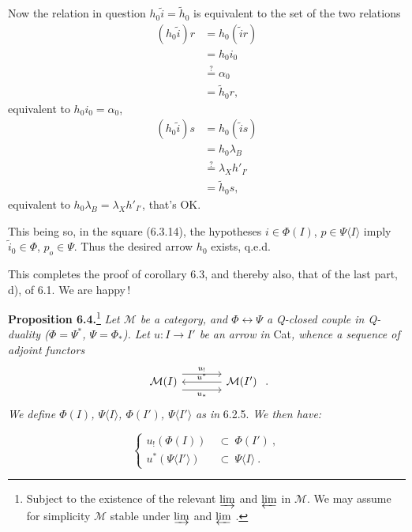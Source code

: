 
Now the relation in question $h_0\tilde{i} = \tilde{h}_0$ is equivalent to the set of the two relations
\[
\begin{aligned}
(h_0\tilde{i})r &= h_0(\tilde{i}r)\\
&= h_0i_0\\
&\overset{?}{=} \alpha_0\\
&= \tilde{h}_0r,
\end{aligned}
\]
equivalent to $h_0i_0 = \alpha_0$,
\[
\begin{aligned}
(h_0\tilde{i})s &= h_0(\tilde{i}s)\\
&= h_0\lambda_B\\
&\overset{?}{=} \lambda_Xh'_{I'}\\
&= \tilde{h}_0s,
\end{aligned}
\]
equivalent to $h_0\lambda_B = \lambda_Xh'_{I'}$, that's OK.

This being so, in the square (6.3.14), the hypotheses $i \in \Phi(I)$, $p \in \Psi\langle I\rangle$ imply $\tilde{i}_0 \in \Phi$, $p_o \in \Psi$. Thus the desired arrow $h_0$ exists, q.e.d. %

This completes the proof of corollary 6.3, and thereby also, that of the last part, d), of 6.1. We are happy\,!


\textbf{Proposition 6.4.}\footnote[34]{Subject to the existence of the relevant $\varinjlim$ and $\varprojlim$ in $\mathcal{M}$. We may assume for simplicity $\mathcal{M}$ stable under $\varinjlim$ and $\varprojlim$ .} %
\textit{Let $\mathcal{M}$ be a category, and $\Phi \longleftrightarrow \Psi$ a Q-closed couple in Q-duality ($\Phi = \Psi^*$, $\Psi = \Phi_*$). Let $u : I \longrightarrow I'$ be an arrow in} Cat\textit{, whence a sequence of adjoint functors}
\[
\begin{tikzcd}[column sep=large]
\mathcal{M}(I) \arrow[r, shift left=3, "u_!"] \arrow[r, shift right=3, "u_*"'] & \mathcal{M}(I') \arrow[l, "u^*"']
\end{tikzcd}\ .
\]
\textit{We define $\Phi(I)$, $\Psi\langle I\rangle$, $\Phi(I')$, $\Psi\langle I'\rangle$ as in} 6.2.5. \textit{We then have:}

\[
\left\{
\begin{aligned}
u_!(\Phi(I)) &\ \subset\ \Phi(I')\ ,\\
u^*(\Psi\langle I'\rangle) &\ \subset\ \Psi\langle I\rangle\ .
\end{aligned}
\right.
\tag*{(6.4.1)}
\]

